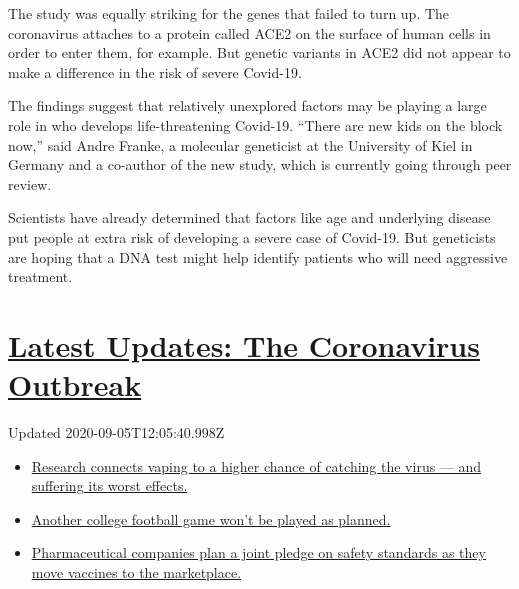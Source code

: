 The study was equally striking for the genes that failed to turn up. The
coronavirus attaches to a protein called ACE2 on the surface of human
cells in order to enter them, for example. But genetic variants in ACE2
did not appear to make a difference in the risk of severe Covid-19.

The findings suggest that relatively unexplored factors may be playing a
large role in who develops life-threatening Covid-19. ``There are new
kids on the block now,'' said Andre Franke, a molecular geneticist at
the University of Kiel in Germany and a co-author of the new study,
which is currently going through peer review.

Scientists have already determined that factors like age and underlying
disease put people at extra risk of developing a severe case of
Covid-19. But geneticists are hoping that a DNA test might help identify
patients who will need aggressive treatment.

\hypertarget{latest-updates-the-coronavirus-outbreak}{%
\section{\texorpdfstring{\href{https://www.nytimes3xbfgragh.onion/2020/09/04/world/covid-19-coronavirus.html?action=click\&pgtype=Article\&state=default\&region=MAIN_CONTENT_1\&context=storylines_live_updates}{Latest
Updates: The Coronavirus
Outbreak}}{Latest Updates: The Coronavirus Outbreak}}\label{latest-updates-the-coronavirus-outbreak}}

Updated 2020-09-05T12:05:40.998Z

\begin{itemize}
\tightlist
\item
  \href{https://www.nytimes3xbfgragh.onion/2020/09/04/world/covid-19-coronavirus.html?action=click\&pgtype=Article\&state=default\&region=MAIN_CONTENT_1\&context=storylines_live_updates\#link-1654f6ad}{Research
  connects vaping to a higher chance of catching the virus --- and
  suffering its worst effects.}
\item
  \href{https://www.nytimes3xbfgragh.onion/2020/09/04/world/covid-19-coronavirus.html?action=click\&pgtype=Article\&state=default\&region=MAIN_CONTENT_1\&context=storylines_live_updates\#link-52e4198a}{Another
  college football game won't be played as planned.}
\item
  \href{https://www.nytimes3xbfgragh.onion/2020/09/04/world/covid-19-coronavirus.html?action=click\&pgtype=Article\&state=default\&region=MAIN_CONTENT_1\&context=storylines_live_updates\#link-181cef0}{Pharmaceutical
  companies plan a joint pledge on safety standards as they move
  vaccines to the marketplace.}
\end{itemize}

